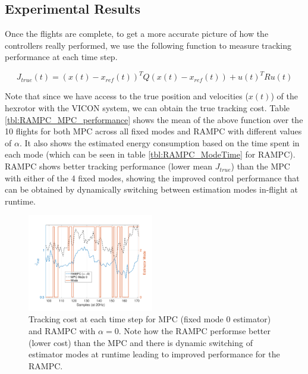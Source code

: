 \subsection{Experimental Results}

Once the flights are complete, to get a more accurate picture of how the controllers really performed, we use the following function to measure tracking performance at each time step.

\begin{equation}
	J_{true}(t) =  (x(t)-x_{ref}(t))^{T}Q(x(t)-x_{ref}(t)) + u(t)^{T}Ru(t)
\end{equation}

Note that since we have access to the true position and velocities ($x(t)$) of the hexrotor with the VICON system, we can obtain the true tracking cost. Table \ref{tbl:RAMPC_MPC_performance} shows the mean of the above function over the 10 flights for both MPC across all fixed modes and RAMPC with different values of $\alpha$. It also shows the estimated energy consumption based on the time spent in each mode (which can be seen in table \ref{tbl:RAMPC_ModeTime} for RAMPC). RAMPC shows better tracking performance (lower mean $J_{true}$) than the MPC with either of the 4 fixed modes, showing the improved control performance that can be obtained by dynamically switching between estimation modes in-flight at runtime. 

\begin{figure}[tbh]
	\centering
	\includegraphics[width=0.49\textwidth]{figures/CostAndModes}
	\caption{Tracking cost at each time step for MPC (fixed mode 0 estimator) and RAMPC with $\alpha=0$. Note how the RAMPC performse better (lower cost) than the MPC and there is dynamic switching of estimator modes at runtime leading to improved performance for the RAMPC.}	
	\label{fig:CostAndModes}
\end{figure}


